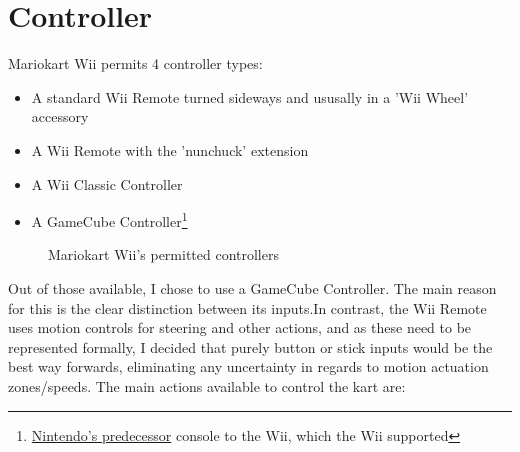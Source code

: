 \section{Controller}
Mariokart Wii permits 4  controller types:
\begin{itemize}
    \item A standard Wii Remote turned sideways and ususally in a 'Wii Wheel' accessory
    \item A Wii Remote with the 'nunchuck' extension
    \item A Wii Classic Controller
    \item A GameCube Controller\footnote{\href{https://www.nintendo.co.uk/Hardware/Nintendo-History/Nintendo-GameCube/Nintendo-GameCube-627129.html}{Nintendo's predecessor} console to the Wii, which the Wii supported}
\end{itemize}
\begin{figure}[ht]
    \centering
    \hfill
    \hfill
    \hfill
    \caption{Mariokart Wii's permitted controllers}
\end{figure}
Out of those available, I chose to use a GameCube Controller. The main reason for this is the clear distinction between its inputs.In contrast, the Wii Remote uses motion controls for steering and other actions, and as these need to be represented formally, I decided that purely button or stick inputs would be the best way forwards, eliminating any uncertainty in regards to motion actuation zones/speeds. The main actions available to control the kart are:
\renewcommand{\labelitemii}{$\rightarrow$}

